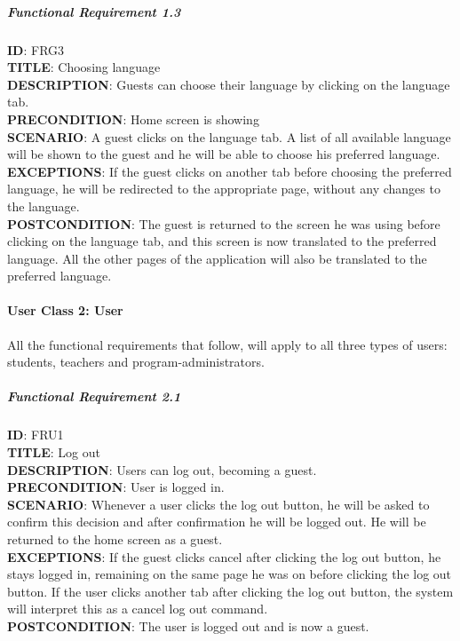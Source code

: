 \documentclass[9pt]{article}
\begin{document}
\subparagraph{Functional Requirement
1.3}\label{functional-requirement-1.3}

\textbf{ID}: FRG3\\\textbf{TITLE}: Choosing
language\\\textbf{DESCRIPTION}: Guests can choose their language by
clicking on the language tab.\\\textbf{PRECONDITION}: Home screen is
showing\\\textbf{SCENARIO}: A guest clicks on the language tab. A list
of all available language will be shown to the guest and he will be able
to choose his preferred language.\\\textbf{EXCEPTIONS}: If the guest
clicks on another tab before choosing the preferred language, he will be
redirected to the appropriate page, without any changes to the
language.\\\textbf{POSTCONDITION}: The guest is returned to the screen
he was using before clicking on the language tab, and this screen is now
translated to the preferred language. All the other pages of the
application will also be translated to the preferred language.

\paragraph{User Class 2: User}\label{user-class-2-user}

All the functional requirements that follow, will apply to all three
types of users: students, teachers and program-administrators.

\subparagraph{Functional Requirement
2.1}\label{functional-requirement-2.1}

\textbf{ID}: FRU1\\\textbf{TITLE}: Log out\\\textbf{DESCRIPTION}: Users
can log out, becoming a guest.\\\textbf{PRECONDITION}: User is logged
in.\\\textbf{SCENARIO}: Whenever a user clicks the log out button, he
will be asked to confirm this decision and after confirmation he will be
logged out. He will be returned to the home screen as a
guest.\\\textbf{EXCEPTIONS}: If the guest clicks cancel after clicking
the log out button, he stays logged in, remaining on the same page he
was on before clicking the log out button. If the user clicks another
tab after clicking the log out button, the system will interpret this as
a cancel log out command.\\\textbf{POSTCONDITION}: The user is logged
out and is now a guest.
\end{document}
